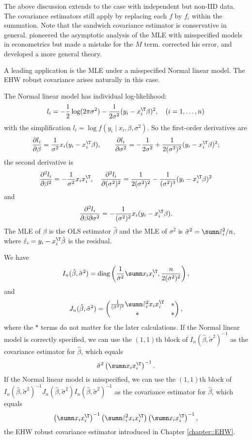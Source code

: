 The above discussion extends to the case with independent but non-IID data. The covariance estimators still apply by replacing each $f$ by $f_i$ within the summation. Note that the sandwich covariance estimator is conservative in general. \citet{white1982maximum} pioneered the asymptotic analysis of the MLE with misspecified models in econometrics but made a mistake for the $M$ term. \citet{chow1984maximum} corrected his error, and \citet{abadie2014inference} developed a more general theory. 


A leading application is the MLE under a misspecified Normal linear model. The EHW robust covariance arises naturally in this case. 


\begin{example}
\label{eg::huber-EHW}
The Normal linear model has individual log-likelihood: 
$$
l_i  = -\frac{1}{2} \log(2\pi\sigma^2) - \frac{1}{2\sigma^2} (y_i - x_i^{\T} \beta)^2 ,\quad (i=1, \ldots, n)
$$
with the simplification $l_i = \log  f(y_i \mid x_i, \beta, \sigma^2).$
So the first-order derivatives are
$$
\frac{\partial l_i   }{ \partial \beta } = \frac{1}{\sigma^2} x_i (y_i - x_i^{\T} \beta), \quad 
\quad 
\frac{\partial l_i  }{ \partial \sigma^2} = -\frac{1}{2 \sigma^2} +  \frac{1}{2(\sigma^2)^2}  (y_i - x_i^{\T} \beta)^2 ;
$$
the second derivative is
$$
\frac{\partial^2 l_i   }{ \partial \beta^2 } =
-  \frac{1}{\sigma^2} x_i x_i^{\T},\quad
\frac{\partial^2 l_i   }{ \partial (\sigma^2)^2 } =
\frac{1}{2(\sigma^2)^2} - \frac{1}{(\sigma^2)^3} (y_i - x_i^{\T} \beta)^2
$$
and
$$
\frac{\partial^2 l_i  }{ \partial \beta \partial \sigma^2} =
-\frac{1}{(\sigma^2)^2}  x_i (y_i - x_i^{\T} \beta).
$$
The MLE of $\beta$ is the OLS estimator $\hat{\beta}$ and the MLE of $\sigma^2$ is $\tilde{\sigma}^2 = \sumn \hat{\varepsilon}_i^2 /n$, where $ \hat{\varepsilon}_i = y_i - x_i^{\T} \hat{\beta}$  is the residual.  

We have
$$
I_n(\hat\beta, \tilde\sigma^2 ) = \textup{diag}\left( \frac{1}{  \tilde{\sigma}^2}  \sumn x_i x_i^{\T} , \frac{n}{  2 (\tilde{\sigma}^2)^2 } \right), 
$$
and
$$
J_n(\hat\beta, \tilde\sigma^2 ) = \begin{pmatrix}
\frac{1}{  (\tilde{\sigma}^2)^2 }  \sumn  \hat{\varepsilon}_i^2 x_i x_i^{\T}  & *\\
*&*
\end{pmatrix},
$$
where the $*$ terms do not matter for the later calculations. If the Normal linear model is correctly specified, we can use the $(1,1)$th block of $I_n(\hat\beta, \tilde\sigma^2 )^{-1}$ as the covariance estimator for $\hat{\beta}$, which equals
$$
 \tilde{\sigma}^2  \left( \sumn x_i x_i^{\T} \right)^{-1}.
$$
If the Normal linear model is  misspecified, we can use the $(1,1)$th block of $I_n(\hat\beta, \tilde\sigma^2 )^{-1} J_n(\hat\beta, \tilde\sigma^2 ) I_n(\hat\beta, \tilde\sigma^2 )^{-1}$ as the covariance estimator for $\hat{\beta}$, which equals
$$
\left( \sumn x_i x_i^{\T} \right)^{-1}
\left(   \sumn  \hat{\varepsilon}_i^2 x_i x_i^{\T}  \right) 
\left( \sumn x_i x_i^{\T} \right)^{-1},
$$
the EHW robust covariance estimator introduced in Chapter \ref{chapter::EHW}. 
\end{example}





